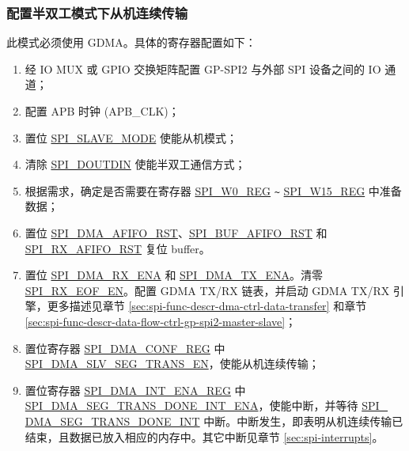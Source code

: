 \documentclass[main\_\_CN.tex]{subfiles}
\begin{document}
\subsubsection{配置半双工模式下从机连续传输}\label{sec:spi-config-slave-seg-trans-half-duplex}

此模式必须使用 GDMA。具体的寄存器配置如下：

\begin{enumerate}
   \item 经 IO MUX 或 GPIO 交换矩阵配置 GP-SPI2 与外部 SPI 设备之间的 IO 通道；

   \item 配置 APB 时钟 (APB\_CLK)；

    \item 置位 \hyperref[fielddesc:SPISLAVEMODE]{SPI\_SLAVE\_MODE} 使能从机模式；

    \item 清除 \hyperref[fielddesc:SPIDOUTDIN]{SPI\_DOUTDIN} 使能半双工通信方式；

    \item 根据需求，确定是否需要在寄存器 \hyperref[regdesc:SPIW0REG]{SPI\_W0\_REG} \verb+~+ \hyperref[regdesc:SPIW15REG]{SPI\_W15\_REG} 中准备数据；

    \item 置位 \hyperref[fielddesc:SPIDMAAFIFORST]{SPI\_DMA\_AFIFO\_RST}、\hyperref[fielddesc:SPIBUFAFIFORST]{SPI\_BUF\_AFIFO\_RST} 和 \hyperref[fielddesc:SPIRXAFIFORST]{SPI\_RX\_AFIFO\_RST} 复位 buffer。

    \item 置位 \hyperref[fielddesc:SPIDMARXENA]{SPI\_DMA\_RX\_ENA} 和 \hyperref[fielddesc:SPIDMATXENA]{SPI\_DMA\_TX\_ENA}。清零 \hyperref[fielddesc:SPIRXEOFEN]{SPI\_RX\_EOF\_EN}。配置 GDMA TX/RX 链表，并启动 GDMA TX/RX 引擎，更多描述见章节 \ref{sec:spi-func-descr-dma-ctrl-data-transfer} 和章节 \ref{sec:spi-func-descr-data-flow-ctrl-gp-spi2-master-slave}；

    \item 置位寄存器 \hyperref[regdesc:SPIDMACONFREG]{SPI\_DMA\_CONF\_REG} 中 \hyperref[fielddesc:SPIDMASLVSEGTRANSEN]{SPI\_DMA\_SLV\_SEG\_TRANS\_EN}，使能从机连续传输；

    \item 置位寄存器 \hyperref[regdesc:SPIDMAINTENAREG]{SPI\_DMA\_INT\_ENA\_REG} 中 \hyperref[fielddesc:SPIDMASEGTRANSDONEINTENA]{SPI\_DMA\_SEG\_TRANS\_DONE\_INT\_ENA}，使能中断，并等待 \hyperref[int:SPIDMASEGTRANSDONEINT]{SPI\_\\DMA\_SEG\_TRANS\_DONE\_INT} 中断。中断发生，即表明从机连续传输已结束，且数据已放入相应的内存中。其它中断见章节 \ref{sec:spi-interrupts}。
\end{enumerate}
\end{document}
